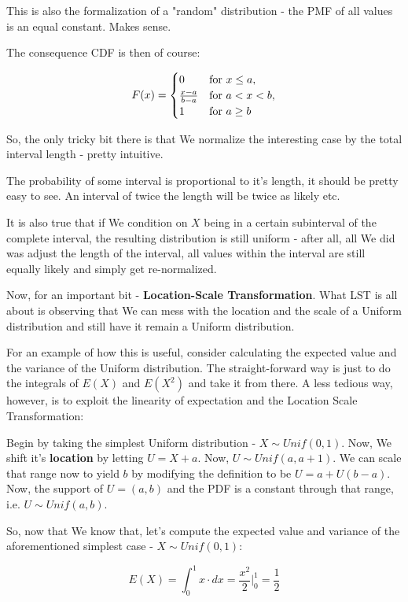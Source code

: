 \documentclass{article}
\begin{document}
		This is also the formalization of a "random" distribution - the PMF of all values is an equal constant. Makes sense.
		
		The consequence CDF is then of course:
		
		\[ F(x) = 	\begin{cases}
						0 & \textnormal{for } x \le a, \\
						\frac{x - a}{b-a} & \textnormal{for } a < x < b, \\
						1 & \textnormal{for } a \ge b						
					\end{cases}			\]
		
		So, the only tricky bit there is that We normalize the interesting case by the total interval length - pretty intuitive.
		
		The probability of some interval is proportional to it's length, it should be pretty easy to see. An interval of twice the length will be twice as likely etc.
		
		It is also true that if We condition on $X$ being in a certain subinterval of the complete interval, the resulting distribution is still uniform - after all, all We did was adjust the length of the interval, all values within the interval are still equally likely and simply get re-normalized.
		
		Now, for an important bit - \textbf{Location-Scale Transformation}. What LST is all about is observing that We can mess with the location and the scale of a Uniform distribution and still have it remain a Uniform distribution. 
		
		For an example of how this is useful, consider calculating the expected value and the variance of the Uniform distribution. The straight-forward way is just to do the integrals of $E(X)$ and $E(X^2)$ and take it from there. A less tedious way, however, is to exploit the linearity of expectation and the Location Scale Transformation:
		
		Begin by taking the simplest Uniform distribution - $X\sim Unif(0, 1)$. Now, We shift it's \textbf{location} by letting $U = X + a$. Now, $U\sim Unif(a, a+1)$. We can scale that range now to yield $b$ by modifying the definition to be $U = a + U(b-a)$. Now, the support of $U = (a, b)$ and the PDF is a constant through that range, i.e. $U\sim Unif(a, b)$.
		
		So, now that We know that, let's compute the expected value and variance of the aforementioned simplest case - $X\sim Unif(0, 1)$:
		
		\[ E(X) = \int^1_0 x\cdot dx= \frac{x^2}{2}\bigg|^1_0 = \frac{1}{2} \]
		
\end{document}
